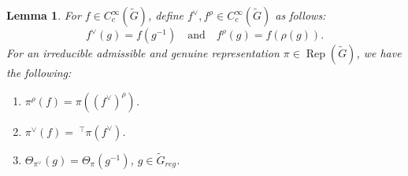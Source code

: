 \documentclass[11pt, a4paper, reqno]{amsart}
\newtheorem{lemma}[theorem]{Lemma}
\theoremstyle{definition}
\theoremstyle{remark}
\theoremstyle{example}
\theoremstyle{note}
\numberwithin{equation}{section}
\DeclareMathOperator{\Rep}{Rep}
\begin{document}
\begin{lemma}\label{pi rho f is same as pi f check rho} For $f \in C_{c}^{\infty}(\widetilde{G})$, define $f^{\vee},f^{\rho} \in C_{c}^{\infty}(\widetilde{G})$ as follows:
\[f^{\vee}(g)=f(g^{-1}) \quad \text{and} \quad f^{\rho}(g)=f(\rho(g)).\]
For an irreducible admissible and genuine representation $\pi\in \Rep(\widetilde{G})$, we have the following: 
\begin{enumerate}
\item[\emph{1)}] $\pi^{\rho}(f)=\pi((f^{\vee})^{\rho})$.
\smallskip
\item[\emph{2)}] $\pi^{\vee}(f)= ~^{\top}\pi(f^{\vee})$.
\smallskip
\item[\emph{3)}] $\Theta_{\pi^{\vee}}(g)=\Theta_{\pi}(g^{-1})$, $g\in \widetilde{G}_{reg}$. \\
\end{enumerate}
\end{lemma}
\end{document}
